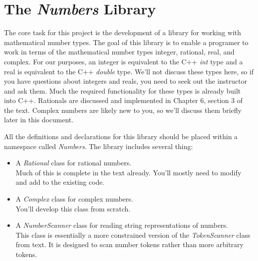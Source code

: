 \documentclass[10pt]{article}
\begin{document}
\section{The \textit{Numbers} Library}

The core task for this project is the development of a library for working with mathematical number types. The goal of this library is to enable a programer to work in terms of the mathematical number types integer, rational, real, and complex. For our purposes, an integer is equivalent to the C++ \textit{int} type and a real is equivalent to the C++ \textit{double} type.  We'll not discuss these types here, so if you have questions about integers and reals, you need to seek out the instructor and ask them. Much the required functionality for these types is already built into C++. Rationals are discussed and implemented in Chapter 6, section 3 of the text. Complex numbers are likely new to you, so we'll discuss them briefly later in this document.  

All the definitions and declarations for this library should be placed within a namespace called \textit{Numbers}. The library includes several thing:
\begin{itemize}
\item A \textit{Rational} class for rational numbers. \\ Much of this is complete in the text already. You'll mostly need to modify and add to the existing code.
\item A \textit{Complex} class for complex numbers. \\ You'll develop this class from scratch.
\item A \textit{NumberScanner} class for reading string representations of numbers. \\ This class is essentially a more constrained version of the \textit{TokenScanner} class from text. It is designed to scan number tokens rather than more arbitrary tokens.
\end{itemize}
\end{document}
